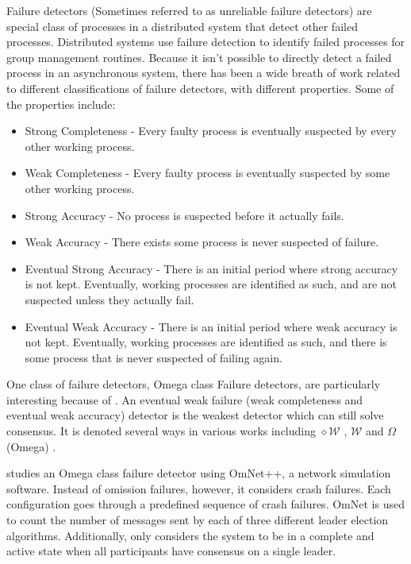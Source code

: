 Failure detectors \cite{FAILUREDETECTORS} (Sometimes referred to as unreliable failure detectors)
 are special class of processes in a distributed system that
detect other failed processes. Distributed systems use failure detection to
identify failed processes for group management routines. Because it isn't
possible to directly detect a failed process in an asynchronous system, there
has been a wide breath of work related to different classifications of failure
detectors, with different properties. Some of the properties include:

\begin{itemize}
    \item Strong Completeness - Every faulty process is eventually suspected by
        every other working process.
    \item Weak Completeness - Every faulty process is eventually suspected by 
        some other working process.
    \item Strong Accuracy - No process is suspected before it actually fails.
    \item Weak Accuracy - There exists some process is never suspected of failure.
    \item Eventual Strong Accuracy - There is an initial period where strong
        accuracy is not kept. Eventually, working processes are identified
        as such, and are not suspected unless they actually fail.
    \item Eventual Weak Accuracy - There is an initial period where weak
        accuracy is not kept. Eventually, working processes are identified
        as such, and there is some process that is never suspected of failing
        again.
\end{itemize} \cite{FAILUREDETECTORS}

One class of failure detectors, Omega class Failure detectors, are particularly interesting
because of \cite{LEADERELECTIONEVAL}. An eventual weak failure (weak completeness and eventual weak accuracy) 
detector is the weakest detector which can still solve consensus. It is denoted several ways
in various works including $\diamond \mathcal{W}$ \cite{FAILUREDETECTORS}, $\mathcal{W}$ \cite{WEAKESTFAILURE1} \cite{WEAKESTFAILURE2} and $\Omega$ (Omega) \cite{LEADERELECTIONEVAL}.

\cite{LEADERELECTIONEVAL} studies an Omega class failure detector using OmNet++, a network simulation software.
Instead of omission failures, however, it considers crash failures. Each configuration goes
through a predefined sequence of crash failures. OmNet is used to count the number of messages
sent by each of three different leader election algorithms. Additionally, \cite{LEADERELECTIONEVAL} only considers
the system to be in a complete and active state when all participants have consensus on a 
single leader.
